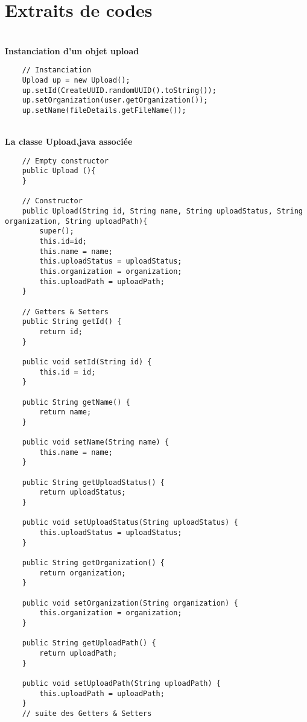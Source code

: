 \pagebreak

\section{Extraits de codes}\label{Annexe C}\\

\textbf{Instanciation d'un objet upload}\\
\begin{lstlisting}
	// Instanciation
	Upload up = new Upload();
	up.setId(CreateUUID.randomUUID().toString());
	up.setOrganization(user.getOrganization());
	up.setName(fileDetails.getFileName());
\end{lstlisting} \\

\textbf{La classe Upload.java associée}\\

\begin{lstlisting}
	// Empty constructor
	public Upload (){
	}

    // Constructor
    public Upload(String id, String name, String uploadStatus, String organization, String uploadPath){
        super();
        this.id=id;
        this.name = name;
        this.uploadStatus = uploadStatus;
        this.organization = organization;
        this.uploadPath = uploadPath;
    }
    
    // Getters & Setters
    public String getId() {
        return id;
    }

    public void setId(String id) {
        this.id = id;
    }
    
    public String getName() {
        return name;
    }

    public void setName(String name) {
        this.name = name;
    }

    public String getUploadStatus() {
        return uploadStatus;
    }

    public void setUploadStatus(String uploadStatus) {
        this.uploadStatus = uploadStatus;
    }

    public String getOrganization() {
        return organization;
    }

    public void setOrganization(String organization) {
        this.organization = organization;
    }

    public String getUploadPath() {
        return uploadPath;
    }

    public void setUploadPath(String uploadPath) {
        this.uploadPath = uploadPath;
    }
	// suite des Getters & Setters
\end{lstlisting} \\

